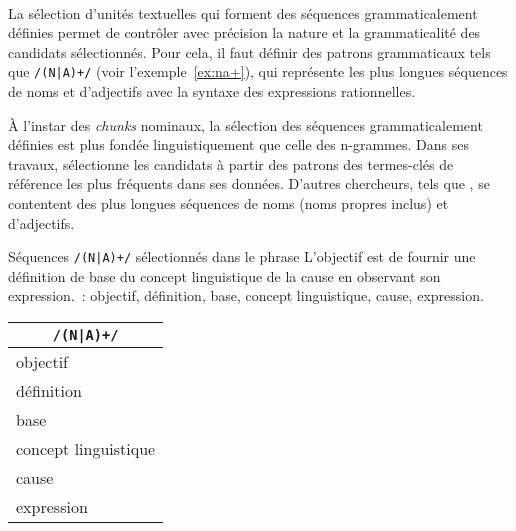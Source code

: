     ~\\La sélection d'unités textuelles qui forment des séquences
    grammaticalement définies permet de contrôler
    avec précision la nature et la grammaticalité des candidats sélectionnés.
    Pour cela, il faut définir des patrons grammaticaux tels que
    \texttt{/(N|A)+/} (voir l'exemple~\ref{ex:na+}), qui représente les plus
    longues séquences de noms et d'adjectifs avec la syntaxe des expressions
    rationnelles.

    À l'instar des \textit{chunks} nominaux, la sélection des séquences
    grammaticalement définies est plus fondée linguistiquement que celle des
    n-grammes. Dans ses travaux, 
    sélectionne les candidats à partir des patrons des termes-clés de référence
    les plus fréquents dans ses données. D'autres chercheurs,
    tels que , se contentent des plus longues
    séquences de noms (noms propres inclus) et d'adjectifs.

    \begin{example}\label{ex:na+}
      Séquences \texttt{/(N|A)+/} sélectionnés dans le phrase \og{}L'objectif
      est de fournir une définition de base du concept linguistique de la cause
      en observant son expression.\fg{}~: \og{}objectif\fg{},
      \og{}définition\fg{}, \og{}base\fg{}, \og{}concept linguistique\fg{},
      \og{}cause\fg{}, \og{}expression\fg{}.
      \begin{center}
        \begin{tabular}{l}
          \toprule
          \multicolumn{1}{c}{\textbf{\texttt{/(N|A)+/}}}\\
          \hline
          \og{}objectif\fg{}\\
          \og{}définition\fg{}\\
          \og{}base\fg{}\\
          \og{}concept linguistique\fg{}\\
          \og{}cause\\
          \og{}expression\fg{}\\
          \bottomrule
        \end{tabular}
      \end{center}\vspace{.25em}
    \end{example}

